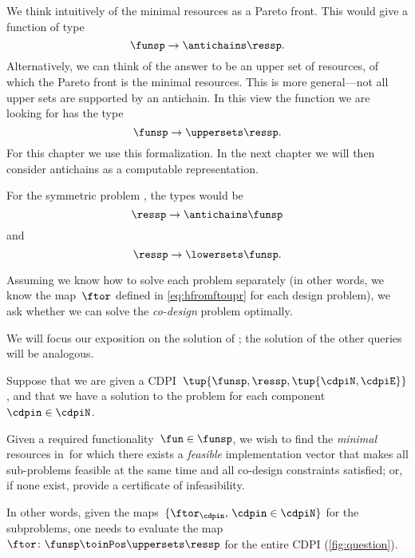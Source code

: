 We think intuitively of the minimal resources as a Pareto front. This would give a function of type
\begin{equation}
    \funsp \to \antichains\ressp.
\end{equation}
Alternatively, we can think of the answer to be an upper set of resources, of which the Pareto front is the minimal resources. This is more general---not all upper sets are supported by an antichain. In this view the function we are looking for has the type
\begin{equation}
    \funsp \to \uppersets\ressp.
\end{equation}
For this chapter we use this formalization. In the next chapter we will then consider antichains as a computable representation.

For the symmetric problem \FixResMaxFun, the types would be
\begin{equation}
    \ressp \to \antichains\funsp
\end{equation}
and
\begin{equation}
    \ressp \to \lowersets\funsp.
\end{equation}


Assuming we know how to solve each problem separately (in other words, we know the map~$\ftor$ defined in \cref{eq:hfromftoupr} for each design problem), we ask whether we can solve
the \emph{co-design} problem optimally.

We will focus our exposition on the solution of \FixFunMinRes; the solution of the other queries will be analogous.


\begin{problem}
    \label{prob:MCDP}
    Suppose that we are given a CDPI~$\tup{ \funsp,\ressp,\tup{ \cdpiN,\cdpiE} }$, and
    that we have a solution to the \FixFunMinRes problem for each component~$\cdpin\in\cdpiN$.

    Given a required functionality~$\fun\in\funsp$, we wish to find
    the \emph{minimal} resources in~\ressp for which there exists
    a \emph{feasible} implementation vector that makes all sub-problems feasible
    at the same time and all co-design constraints satisfied; or, if
    none exist, provide a certificate of infeasibility.
\end{problem}
In other words, given the maps~$\{\ftor_{\cdpin},\,\cdpin\in\cdpiN\}$
for the subproblems, one needs to evaluate  the map~$\ftor\colon\funsp \toinPos \uppersets \ressp$
for the entire CDPI (\cref{fig:question}).

